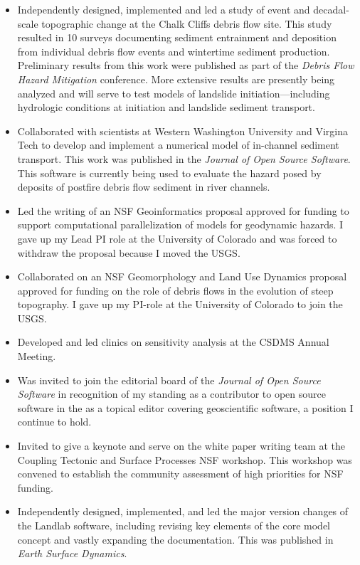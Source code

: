 \documentclass[10pt]{article}
\begin{document}
\begin{itemize}
\item Independently designed, implemented and led a study of event and decadal-scale topographic change at the Chalk Cliffs debris flow site. This study resulted in 10 surveys documenting sediment entrainment and deposition from individual debris flow events and wintertime sediment production. Preliminary results from this work were published as part of the \textit{Debris Flow Hazard Mitigation} conference. More extensive results are presently being analyzed and will serve to test models of landslide initiation---including hydrologic conditions at initiation and landslide sediment transport. 
\item Collaborated with scientists at Western Washington University and Virgina Tech to develop and implement a numerical model of in-channel sediment transport. This work was published in the \textit{Journal of Open Source Software}. This software is currently being used to evaluate the hazard posed by deposits of postfire debris flow sediment in river channels.  
\item Led the writing of an NSF Geoinformatics proposal approved for funding to support computational parallelization of models for geodynamic hazards. I gave up my Lead PI role at the University of Colorado and was forced to withdraw the proposal because I moved the USGS.
\item Collaborated on an NSF Geomorphology and Land Use Dynamics proposal approved for funding on the role of debris flows in the evolution of steep topography. I gave up my PI-role at the University of Colorado to join the USGS. 
\item Developed and led clinics on sensitivity analysis at the CSDMS Annual Meeting. 
\item Was invited to join the editorial board of the \textit{Journal of Open Source Software} in recognition of my standing as a contributor to open source software in the as a topical editor covering geoscientific software, a position I continue to hold.
\item Invited to give a keynote and serve on the white paper writing team at the Coupling Tectonic and Surface Processes NSF workshop. This workshop was convened to establish the community assessment of high priorities for NSF funding.  
\item Independently designed, implemented, and led the major version changes of the Landlab software, including revising key elements of the core model concept and vastly expanding the documentation. This was published in \textit{Earth Surface Dynamics}. 

\end{itemize}
\end{document}
